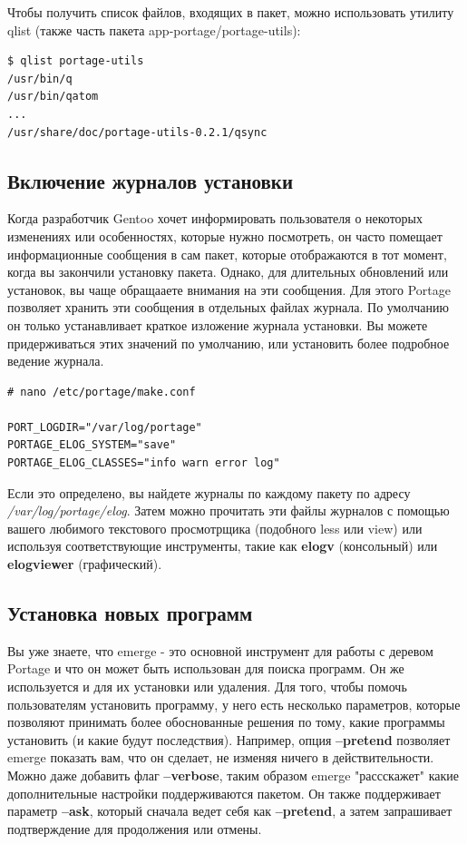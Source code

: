\documentclass[10pt]{book}
\begin{document}
Чтобы получить список файлов, входящих в пакет, можно использовать утилиту qlist (также часть пакета app-portage/portage-utils):

\begin{tcolorbox}
\begin{lstlisting}
$ qlist portage-utils
/usr/bin/q
/usr/bin/qatom
...
/usr/share/doc/portage-utils-0.2.1/qsync
\end{lstlisting}
\end{tcolorbox}

\subsection{Включение журналов установки}

Когда разработчик Gentoo хочет информировать пользователя о некоторых изменениях или особенностях, которые нужно посмотреть, он часто помещает информационные сообщения в сам пакет, которые отображаются в тот момент, когда вы закончили установку пакета. Однако, для длительных обновлений или установок, вы
чаще обращааете внимания на эти сообщения. Для этого Portage позволяет хранить эти сообщения в отдельных файлах журнала. По умолчанию он только устанавливает краткое изложение журнала установки. Вы можете придерживаться этих значений по умолчанию, или установить более подробное ведение журнала.

\begin{tcolorbox}
\begin{lstlisting}
# nano /etc/portage/make.conf

PORT_LOGDIR="/var/log/portage"
PORTAGE_ELOG_SYSTEM="save"
PORTAGE_ELOG_CLASSES="info warn error log"
\end{lstlisting}
\end{tcolorbox}

Если это определено, вы найдете журналы по каждому пакету по адресу  \textit{/var/log/portage/elog}. Затем можно прочитать эти файлы журналов с помощью вашего любимого текстового просмотрщика (подобного  less или view) или используя соответствующие инструменты, такие как \textbf{elogv} (консольный) или \textbf{elogviewer} (графический).

\subsection{Установка новых программ}

Вы уже знаете, что emerge - это основной инструмент для работы с деревом Portage и что он может быть использован для поиска программ. Он же используется и для их установки или удаления. Для того, чтобы помочь пользователям установить программу, у него есть несколько параметров, которые позволяют принимать более обоснованные решения по тому, какие программы установить (и какие будут последствия). Например, опция \textbf{--pretend} позволяет emerge показать вам, что он сделает, не изменяя ничего в действительности. Можно даже добавить флаг \textbf{--verbose}, таким образом emerge "рассскажет" какие дополнительные настройки поддерживаются пакетом. Он также поддерживает параметр \textbf{--ask}, который сначала ведет себя
как \textbf{--pretend}, а затем запрашивает подтверждение для продолжения или отмены.
\end{document}
